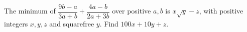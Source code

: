 The minimum of $\dfrac{9b-a}{3a+b}+\dfrac{4a-b}{2a+3b}$ over positive $a,b$ is $x\sqrt y-z$, with positive integers $x,y,z$ and squarefree $y$. Find $100x+10y+z$.

